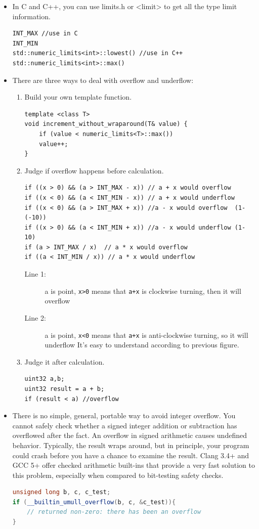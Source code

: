 \documentclass[a4paper,11pt,twoside]{book}
\begin{document}
\begin{itemize}
	\item In C and C++, you can use limits.h or <limit> to get all the type limit information.
	
\begin{lstlisting}[numbers=none]
INT_MAX //use in C
INT_MIN
std::numeric_limits<int>::lowest() //use in C++
std::numeric_limits<int>::max()
\end{lstlisting}
	
	\item There are three ways to deal with overflow and underflow:
	\begin{enumerate}
		\item Build your own template function.
\begin{lstlisting}[numbers=none]
template <class T>
void increment_without_wraparound(T& value) {
	if (value < numeric_limits<T>::max())
	value++;
}
\end{lstlisting}
		
		\item  Judge if overflow happens before calculation.
		
\begin{lstlisting}
if ((x > 0) && (a > INT_MAX - x)) // a + x would overflow 
if ((x < 0) && (a < INT_MIN - x)) // a + x would underflow
if ((x < 0) && (a > INT_MAX + x)) //a - x would overflow  (1-(-10))
if ((x > 0) && (a < INT_MIN + x)) //a - x would underflow (1-10)
if (a > INT_MAX / x)  // a * x would overflow 
if ((a < INT_MIN / x)) // a * x would underflow 
\end{lstlisting}
		\begin{description}
			\item[Line 1:] a is point, \texttt{x>0} means that \texttt{a+x} is clockwise turning, then it will overflow
			\item[Line 2:] a is point, \texttt{x<0} means that \texttt{a+x} is anti-clockwise turning,  so it will underflow It's easy to understand according to previous figure.
		\end{description}
		
		\item Judge it after calculation.
\begin{lstlisting}[numbers = none]
uint32 a,b;
uint32 result = a + b;
if (result < a) //overflow
\end{lstlisting}
	\end{enumerate}
	
	\item There is no simple, general, portable way to avoid integer overflow. You cannot safely check whether a signed integer addition or subtraction has overflowed after the fact. An overflow in signed arithmetic causes undefined behavior. Typically, the result wraps around, but in principle, your program could crash before you have a chance to examine the result. Clang 3.4+ and GCC 5+ offer checked arithmetic built-ins that provide a very fast solution to this problem, especially when compared to bit-testing safety checks.
\begin{lstlisting}[frame=single, language=c++]
unsigned long b, c, c_test;
if (__builtin_umull_overflow(b, c, &c_test)){
	// returned non-zero: there has been an overflow
}
\end{lstlisting}
	

\end{itemize}
\end{document}
